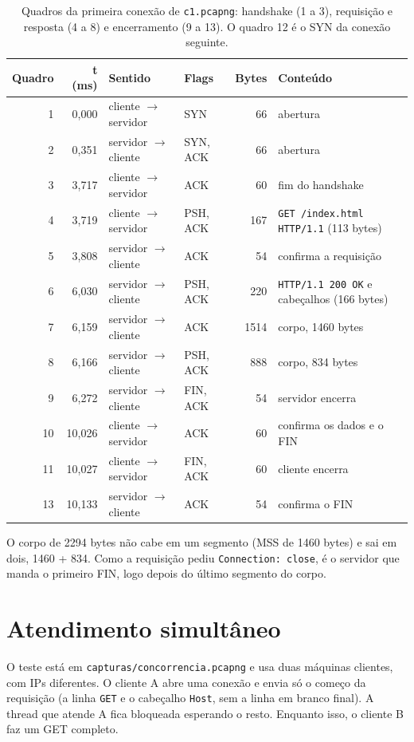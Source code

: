 \documentclass[11pt,a4paper]{article}
\newcommand{\cod}[1]{\texttt{#1}}
\begin{document}
\begin{table}[H]
\centering
\small
\begin{tabular}{@{}rrllrl@{}}
\toprule
\textbf{Quadro} & \textbf{t (ms)} & \textbf{Sentido} & \textbf{Flags} &
\textbf{Bytes} & \textbf{Conteúdo} \\
\midrule
1 & 0,000 & cliente $\to$ servidor & SYN & 66 & abertura \\
2 & 0,351 & servidor $\to$ cliente & SYN, ACK & 66 & abertura \\
3 & 3,717 & cliente $\to$ servidor & ACK & 60 & fim do handshake \\
\midrule
4 & 3,719 & cliente $\to$ servidor & PSH, ACK & 167 & \cod{GET /index.html HTTP/1.1} (113 bytes) \\
5 & 3,808 & servidor $\to$ cliente & ACK & 54 & confirma a requisição \\
6 & 6,030 & servidor $\to$ cliente & PSH, ACK & 220 & \cod{HTTP/1.1 200 OK} e cabeçalhos (166 bytes) \\
7 & 6,159 & servidor $\to$ cliente & ACK & 1514 & corpo, 1460 bytes \\
8 & 6,166 & servidor $\to$ cliente & PSH, ACK & 888 & corpo, 834 bytes \\
\midrule
9 & 6,272 & servidor $\to$ cliente & FIN, ACK & 54 & servidor encerra \\
10 & 10,026 & cliente $\to$ servidor & ACK & 60 & confirma os dados e o FIN \\
11 & 10,027 & cliente $\to$ servidor & FIN, ACK & 60 & cliente encerra \\
13 & 10,133 & servidor $\to$ cliente & ACK & 54 & confirma o FIN \\
\bottomrule
\end{tabular}
\caption{Quadros da primeira conexão de \cod{c1.pcapng}: handshake (1 a 3),
requisição e resposta (4 a 8) e encerramento (9 a 13). O quadro 12 é o SYN da
conexão seguinte.}
\label{tab:transacao}
\end{table}

O corpo de 2294 bytes não cabe em um segmento (MSS de 1460 bytes) e sai em
dois, 1460 + 834. Como a requisição pediu \cod{Connection: close}, é o servidor
que manda o primeiro FIN, logo depois do último segmento do corpo.

\section{Atendimento simultâneo}

O teste está em \cod{capturas/concorrencia.pcapng} e usa duas máquinas
clientes, com IPs diferentes. O cliente A abre uma conexão e envia só o começo
da requisição (a linha \cod{GET} e o cabeçalho \cod{Host}, sem a linha em
branco final). A thread que atende A fica bloqueada esperando o resto.
Enquanto isso, o cliente B faz um GET completo.
\end{document}
